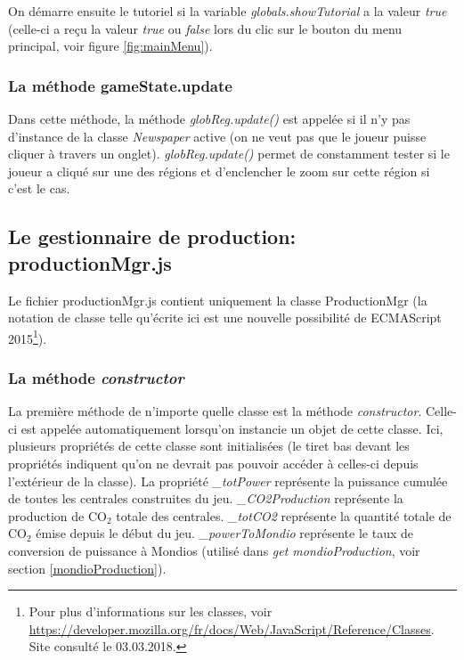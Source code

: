 \documentclass{article}
\begin{document}
		
		On démarre ensuite le tutoriel si la variable \textit{globals.showTutorial} a la valeur \textit{true} (celle-ci a reçu la valeur \textit{true} ou \textit{false} lors du clic sur le bouton du menu principal, voir figure \ref{fig:mainMenu}).
		
		\subsubsection{La méthode gameState.update}
		Dans cette méthode, la méthode \textit{globReg.update()} est appelée si il n'y pas d'instance de la classe \textit{Newspaper} active (on ne veut pas que le joueur puisse cliquer à travers un onglet). \textit{globReg.update()} permet de constamment tester si le joueur a cliqué sur une des régions et d'enclencher le zoom sur cette région si c'est le cas.
		
		
		\subsection{Le gestionnaire de production: productionMgr.js} \label{productionMgr}
		
		Le fichier productionMgr.js contient uniquement la classe ProductionMgr (la notation de classe telle qu'écrite ici est une nouvelle possibilité de ECMAScript 2015\footnote{Pour plus d'informations sur les classes, voir \url{https://developer.mozilla.org/fr/docs/Web/JavaScript/Reference/Classes}. Site consulté le 03.03.2018.}).
		
		\subsubsection{La méthode \textit{constructor}}
		La première méthode de n'importe quelle classe est la méthode \textit{constructor}. Celle-ci est appelée automatiquement lorsqu'on instancie un objet de cette classe. Ici,  plusieurs propriétés de cette classe sont initialisées (le tiret bas devant les propriétés indiquent qu'on ne devrait pas pouvoir accéder à celles-ci depuis l'extérieur de la classe). La propriété \textit{\_totPower} représente la puissance cumulée de toutes les centrales construites du jeu. \textit{\_CO2Production} représente la production de CO$_{2}$ totale des centrales. \textit{\_totCO2} représente la quantité totale de CO$_{2}$ émise depuis le début du jeu. \textit{\_powerToMondio} représente le taux de conversion de puissance à Mondios (utilisé dans \textit{get mondioProduction}, voir section \ref{mondioProduction}).
		
\end{document}
